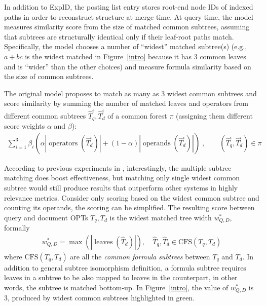 \documentclass[runningheads]{llncs}
\begin{document}
In addition to ExpID, the posting list entry stores root-end node IDs of indexed paths in order to reconstruct structure at merge time.
At query time, the model measures similarity score from the size of matched common subtrees, assuming that subtrees are structurally identical only if their leaf-root paths match.
%
Specifically, the model chooses a number of ``widest'' matched subtree(s) (e.g., $a+bc$ is the widest matched in Figure~\ref{intro} because it has 3 common leaves and is ``wider'' than the other choices) and measure formula similarity based on the size of common subtrees.

The original model proposes to match as many as 3 widest common subtrees and score similarity by summing the number of matched leaves and operators from different common subtrees $\hat{T}_q^i, \hat{T}_d^i$ of a common forest $\pi$ (assigning them different score weights $\alpha$ and $\beta$):
\begin{align}
\label{eq:1}
\sum^3_{i=1} \beta_i \left( \alpha \left|\operatorname{operators}(\hat{T}_d^i)\right| + (1 - \alpha) \left|\operatorname{operands}(\hat{T}_d^i)\right| \right)\;, \qquad (\hat{T}_q^i, \hat{T}_d^i) \in \pi
\end{align}

%
According to previous experiments in \cite{a0_2019}, interestingly, the multiple subtree matching does boost effectiveness, but matching only single widest common subtree would still produce results that outperform other systems in highly relevance metrics.
%
Consider only scoring based on the widest common subtree and counting its operands, the scoring can be simplified. The resulting score between query and document OPTs $T_q, T_d$ is the widest matched tree width $w^*_{Q, D}$, formally
\begin{align}
\label{eq:2}
w^*_{Q, D} = \max(|\operatorname{leaves}(\hat{T}_d)|), \quad \hat{T}_q, \hat{T}_d \in \text{CFS}(T_q, T_d)
\end{align}
where
$\text{CFS}(T_q, T_d)$ are all the \textit{common formula subtrees} between $T_q$ and $T_d$.
In addition to general subtree isomorphism definition, a formula subtree requires leaves in a subtree to be also mapped to leaves in the counterpart, in other words, the subtree is matched bottom-up.
%
In Figure~\ref{intro}, the value of $w^*_{Q, D}$ is 3, produced by widest common subtrees highlighted in green.
\end{document}
